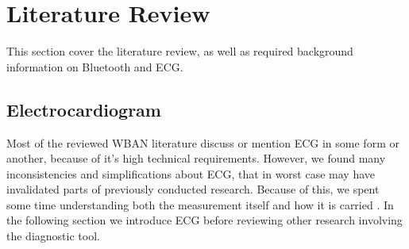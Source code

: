 \section{Literature Review} %
\label{sec:literature_review}


This section cover the literature review, as well as required background information on Bluetooth and ECG.

\subsection{Electrocardiogram} %
\label{sub:electrocardiogram}

Most of the reviewed WBAN literature discuss or mention ECG in some form or another, because of it's high technical requirements. However, we found many inconsistencies and simplifications about ECG, that in worst case may have invalidated parts of previously conducted research. Because of this, we spent some time understanding both the measurement itself and how it is carried . In the following section we introduce ECG before reviewing other research involving the diagnostic tool.

